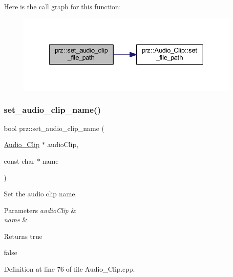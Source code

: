 Here is the call graph for this function\+:
\nopagebreak
\begin{figure}[H]
\begin{center}
\leavevmode
\includegraphics[width=316pt]{namespaceprz_ade1afd9da96172eda2c255f074e82608_cgraph}
\end{center}
\end{figure}
\mbox{\label{namespaceprz_abbc097e730e2a3eb42a2f205fd714bf2}} 
\subsubsection{\texorpdfstring{set\_audio\_clip\_name()}{set\_audio\_clip\_name()}}
{\footnotesize\ttfamily bool prz\+::set\+\_\+audio\+\_\+clip\+\_\+name (\begin{DoxyParamCaption}\item[{\mbox{\hyperlink{classprz_1_1_audio___clip}{Audio\+\_\+\+Clip}} $\ast$}]{audio\+Clip,  }\item[{const char $\ast$}]{name }\end{DoxyParamCaption})}



Set the audio clip name. 


\begin{DoxyParams}{Parameters}
{\em audio\+Clip} & \\
\hline
{\em name} & \\
\hline
\end{DoxyParams}
\begin{DoxyReturn}{Returns}
true 

false 
\end{DoxyReturn}


Definition at line 76 of file Audio\+\_\+\+Clip.\+cpp.

